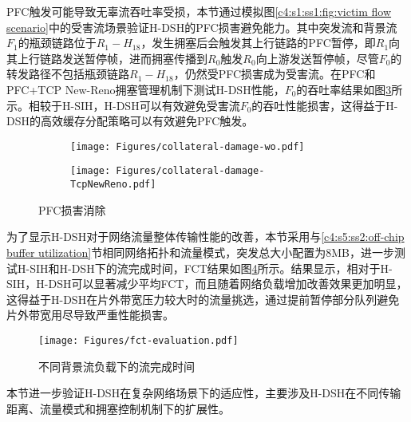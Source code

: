 
PFC触发可能导致无辜流吞吐率受损，本节通过模拟图\ref{c4:s1:ss1:fig:victim flow scenario}中的受害流场景验证H-DSH的PFC损害避免能力。其中突发流和背景流$F_1$的瓶颈链路位于$R_1-H_{18}$，发生拥塞后会触发其上行链路的PFC暂停，即$R_1$向其上行链路发送暂停帧，进而拥塞传播到$R_0$触发$R_0$向上游发送暂停帧，尽管$F_0$的转发路径不包括瓶颈链路$R_1-H_{18}$，仍然受PFC损害成为受害流。在PFC和PFC+TCP New-Reno拥塞管理机制下测试H-DSH性能，$F_0$的吞吐率结果如图\ref{c3:s3:ss4:fig:throughput damage avoidance}所示。相较于H-SIH，H-DSH可以有效避免受害流$F_0$的吞吐性能损害，这得益于H-DSH的高效缓存分配策略可以有效避免PFC触发。

\begin{figure}[H]
  \begin{subfigure}[b]{0.49\linewidth}
      \centering
      \texttt{[image: Figures/collateral-damage-wo.pdf]}
      \label{c3:s3:ss4:fig:sub1:w/o cc f0 throughput}
  \end{subfigure}
  \begin{subfigure}[b]{0.49\linewidth}
      \centering
      \texttt{[image: Figures/collateral-damage-TcpNewReno.pdf]}
      \label{c3:s3:ss4:fig:sub1:new reno f0 throughput}
  \end{subfigure}
  \caption{PFC损害消除}
  \label{c3:s3:ss4:fig:throughput damage avoidance}
\end{figure}

\label{c4:s5:ss4:fct improvement}

为了显示H-DSH对于网络流量整体传输性能的改善，本节采用与\ref{c4:s5:ss2:off-chip buffer utilization}节相同网络拓扑和流量模式，突发总大小配置为8MB，进一步测试H-SIH和H-DSH下的流完成时间，FCT结果如图\ref{c4:s1:ss1:flow fct}所示。结果显示，相对于H-SIH，H-DSH可以显著减少平均FCT，而且随着网络负载增加改善效果更加明显，这得益于H-DSH在片外带宽压力较大时的流量挑选，通过提前暂停部分队列避免片外带宽用尽导致严重性能损害。

\begin{figure}[H]
  \centering
  \texttt{[image: Figures/fct-evaluation.pdf]}
  \caption{不同背景流负载下的流完成时间}
  \label{c4:s1:ss1:flow fct}
\end{figure}

本节进一步验证H-DSH在复杂网络场景下的适应性，主要涉及H-DSH在不同传输距离、流量模式和拥塞控制机制下的扩展性。

